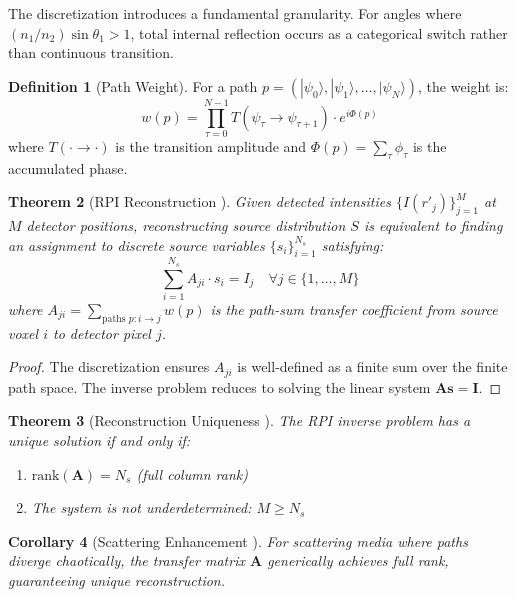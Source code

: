 \documentclass[11pt,a4paper]{article}
\newtheorem{theorem}{Theorem}[section]
\newtheorem{corollary}[theorem]{Corollary}
\theoremstyle{definition}
\newtheorem{definition}[theorem]{Definition}
\theoremstyle{remark}
\begin{document}
The discretization introduces a fundamental granularity. For angles where $(n_1/n_2)\sin\theta_1 > 1$, total internal reflection occurs as a categorical switch rather than continuous transition.

\begin{definition}[Path Weight]
\label{def:path_weight}
For a path $p = (|\psi_0\rangle, |\psi_1\rangle, \ldots, |\psi_N\rangle)$, the weight is:
\begin{equation}
w(p) = \prod_{\tau=0}^{N-1} T(\psi_\tau \to \psi_{\tau+1}) \cdot e^{i\Phi(p)}
\end{equation}
where $T(\cdot \to \cdot)$ is the transition amplitude and $\Phi(p) = \sum_\tau \phi_\tau$ is the accumulated phase.
\end{definition}

\begin{theorem}[RPI Reconstruction \cite{sachikonye2026refraction}]
\label{thm:rpi_reconstruction}
Given detected intensities $\{I(r'_j)\}_{j=1}^M$ at $M$ detector positions, reconstructing source distribution $S$ is equivalent to finding an assignment to discrete source variables $\{s_i\}_{i=1}^{N_s}$ satisfying:
\begin{equation}
\sum_{i=1}^{N_s} A_{ji} \cdot s_i = I_j \quad \forall j \in \{1,\ldots,M\}
\end{equation}
where $A_{ji} = \sum_{\text{paths } p:i\to j} w(p)$ is the path-sum transfer coefficient from source voxel $i$ to detector pixel $j$.
\end{theorem}

\begin{proof}
The discretization ensures $A_{ji}$ is well-defined as a finite sum over the finite path space. The inverse problem reduces to solving the linear system $\mathbf{A}\mathbf{s} = \mathbf{I}$.
\end{proof}

\begin{theorem}[Reconstruction Uniqueness \cite{sachikonye2026refraction}]
\label{thm:reconstruction_uniqueness}
The RPI inverse problem has a unique solution if and only if:
\begin{enumerate}
\item $\text{rank}(\mathbf{A}) = N_s$ (full column rank)
\item The system is not underdetermined: $M \geq N_s$
\end{enumerate}
\end{theorem}

\begin{corollary}[Scattering Enhancement \cite{sachikonye2026refraction}]
\label{cor:scattering_enhancement}
For scattering media where paths diverge chaotically, the transfer matrix $\mathbf{A}$ generically achieves full rank, guaranteeing unique reconstruction.
\end{corollary}
\end{document}
